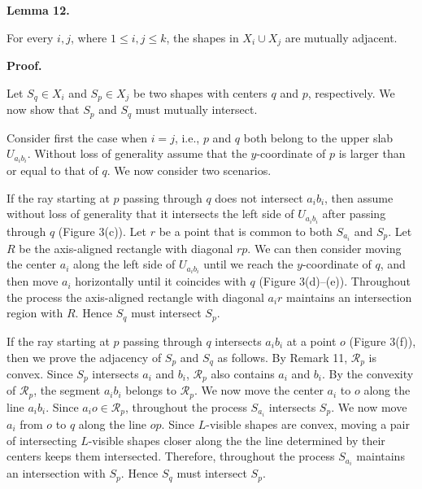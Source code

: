 \documentclass[10pt,a4paper]{amsart}
\begin{document}
\par
\par
\par\medskip\noindent\textbf{Lemma 12.}\par
For every $i,j$, where $1\leq i,j\leq k$, the shapes in $X_{i}\cup X_{j}$ are mutually adjacent.
\par
\par
\par
\par\medskip\noindent\textbf{Proof.}\par
Let $S_{q}\in X_{i}$ and $S_{p}\in X_{j}$ be two shapes with centers $q$ and $p$, respectively. We now show that $S_{p}$ and $S_{q}$ must mutually intersect.
\par
\par
Consider first the case when $i=j$, i.e., $p$ and $q$ both belong to the upper slab $U_{a_{i}b_{i}}$. Without loss of generality assume that the $y$-coordinate of $p$ is larger than or equal to that of $q$. We now consider two scenarios.
\par
\par
If the ray starting at $p$ passing through $q$ does not intersect $a_{i}b_{i}$, then assume without loss of generality that it intersects the left side of $U_{a_{i}b_{i}}$ after passing through $q$ (Figure 3(c)). Let $r$ be a point that is common to both $S_{a_{i}}$ and $S_{p}$. Let $R$ be the axis-aligned rectangle with diagonal $rp$. We can then consider moving the center $a_{i}$ along the left side of $U_{a_{i}b_{i}}$ until we reach the $y$-coordinate of $q$, and then move $a_{i}$ horizontally until it coincides with $q$ (Figure 3(d)–(e)). Throughout the process the axis-aligned rectangle with diagonal $a_{i}r$ maintains an intersection region with $R$. Hence $S_{q}$ must intersect $S_{p}$.
\par
\par
If the ray starting at $p$ passing through $q$ intersects $a_{i}b_{i}$ at a point $o$ (Figure 3(f)), then we prove the adjacency of $S_{p}$ and $S_{q}$ as follows. By Remark 11, $\mathcal{R}_{p}$ is convex. Since $S_{p}$ intersects $a_{i}$ and $b_{i}$, $\mathcal{R}_{p}$ also contains $a_{i}$ and $b_{i}$. By the convexity of $\mathcal{R}_{p}$, the segment $a_{i}b_{i}$ belongs to $\mathcal{R}_{p}$. We now move the center $a_{i}$ to $o$ along the line $a_{i}b_{i}$. Since $a_{i}o\in\mathcal{R}_{p}$, throughout the process $S_{a_{i}}$ intersects $S_{p}$. We now move $a_{i}$ from $o$ to $q$ along the line $op$. Since $L$-visible shapes are convex, moving a pair of intersecting $L$-visible shapes closer along the the line determined by their centers keeps them intersected. Therefore, throughout the process $S_{a_{i}}$ maintains an intersection with $S_{p}$. Hence $S_{q}$ must intersect $S_{p}$.
\end{document}
